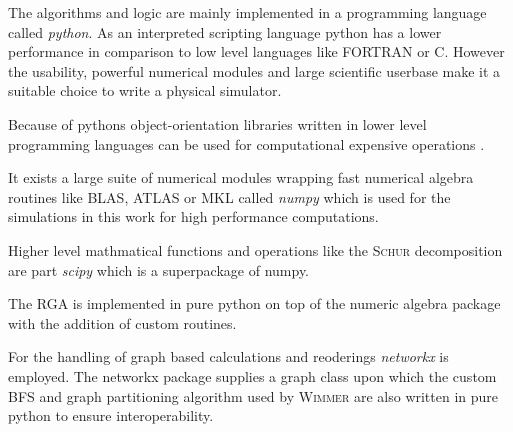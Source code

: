 The algorithms and logic are mainly implemented in a programming language called \emph{python}. As an interpreted scripting language python has a lower performance in comparison to low level languages like FORTRAN or C. However the usability, powerful numerical modules and large scientific userbase make it a suitable choice to write a physical simulator.\par
Because of pythons object-orientation libraries written in lower level programming languages can be used for computational expensive operations .\par
It exists a large suite of numerical modules wrapping fast numerical algebra routines like BLAS, ATLAS or MKL called \emph{numpy} \cite{numpy} which is used for the simulations in this work for high performance computations.\par
Higher level mathmatical functions and operations like the \textsc{Schur} decomposition are part \emph{scipy} \cite{scipy} which is a superpackage of numpy.\par
The RGA is implemented in pure python on top of the numeric algebra package with the addition of custom routines.\par
For the handling of graph based calculations and reoderings \emph{networkx} \cite{networkx} is employed. The networkx package supplies a graph class upon which the custom BFS and graph partitioning algorithm used by \textsc{Wimmer} are also written in pure python to ensure interoperability.
